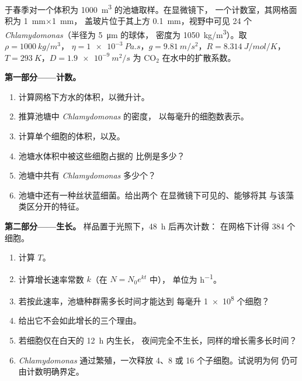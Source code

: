 \begin{problem}
\label{pb:b2:unicellular-diversity:1}
于春季对一个体积为 \qty{1000}{m^3} 的池塘取样。在显微镜下，
一个计数室，其网格面积为 \qty{1}{mm}$\times$\qty{1}{mm}，
盖玻片位于其上方 \qty{0.1}{mm}，视野中可见 24 个
\emph{Chlamydomonas}（半径为 \qty{5}{\micro m} 的球体，
密度为 \qty{1050}{kg/m^3}）。取 $\rho = \qty{1000}{kg/m^3}$，
$\eta = \qty{1e-3}{Pa.s}$，$g = \qty{9.81}{m/s^2}$，$R =
\qty{8.314}{J/mol/K}$，$T = \qty{293}{K}$，$D = \qty{1.9e-9}{m^2/s}$
为 $\mathrm{CO_2}$ 在水中的扩散系数。

\medskip
\noindent\textbf{第一部分——计数。}
\begin{enumerate}
  \item 计算网格下方水的体积，以微升计。
  \item 推算池塘中 \emph{Chlamydomonas} 的密度，
        以每毫升的细胞数表示。
  \item 计算单个细胞的体积，以及。
  \item 池塘水体积中被这些细胞占据的
        比例是多少？
  \item 池塘中共有 \emph{Chlamydomonas} 多少个？
  \item 池塘中还有一种丝状蓝细菌。给出两个
        在显微镜下可见的、能够将其
        与该藻类区分开的特征。
\end{enumerate}

\medskip
\noindent\textbf{第二部分——生长。}
样品置于光照下，\qty{48}{h} 后再次计数：
在网格下计得 \num{384} 个细胞。
\begin{enumerate}[resume]
  \item 计算 $T$。
  \item 计算增长速率常数 $k$（在 $N = N_0 e^{kt}$ 中），
        单位为 \unit{h^{-1}}。
  \item 若按此速率，池塘种群需多长时间才能达到
        每毫升 \qty{1e8}{} 个细胞？
  \item 给出它不会如此增长的三个理由。
  \item 若细胞仅在白天的 \qty{12}{h} 内生长，
        夜间完全不生长，同样的增长需多长时间？
  \item \emph{Chlamydomonas} 通过繁殖，一次释放
        4、8 或 16 个子细胞。试说明为何
        仍可由计数明确界定。
\end{enumerate}


\end{problem}

